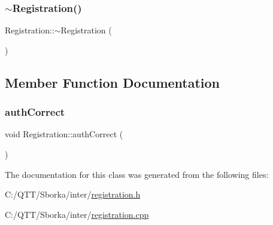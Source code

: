 \mbox{\label{class_registration_af0515fb621bcf46276090b7b26f88fc4}} 
\subsubsection{\texorpdfstring{$\sim$\+Registration()}{~Registration()}}
{\footnotesize\ttfamily Registration\+::$\sim$\+Registration (\begin{DoxyParamCaption}{ }\end{DoxyParamCaption})}



\subsection{Member Function Documentation}
\mbox{\label{class_registration_a509fdfd1458f4cdf30209998ba1ccf33}} 
\subsubsection{\texorpdfstring{auth\+Correct}{authCorrect}}
{\footnotesize\ttfamily void Registration\+::auth\+Correct (\begin{DoxyParamCaption}{ }\end{DoxyParamCaption})\hspace{0.3cm}{\ttfamily [signal]}}



The documentation for this class was generated from the following files\+:\begin{DoxyCompactItemize}
\item 
C\+:/\+Q\+T\+T/\+Sborka/inter/\mbox{\hyperlink{registration_8h}{registration.\+h}}\item 
C\+:/\+Q\+T\+T/\+Sborka/inter/\mbox{\hyperlink{registration_8cpp}{registration.\+cpp}}\end{DoxyCompactItemize}
